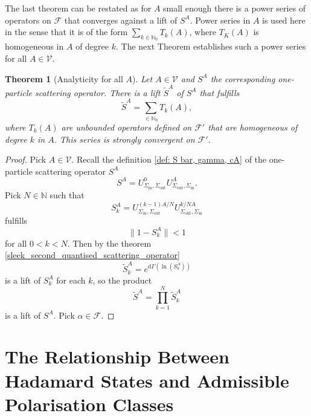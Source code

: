 \documentclass[b5paper,draft,openbib,12pt]{memoir}
\newtheorem{Thm}[Def]{Theorem}
\begin{document}
The last theorem can be restated as for \(A\) small enough 
there is a power series of operators on \(\mathcal{F}\)
that converges against a lift of \(S^A\). Power series in \(A\) 
is used here in the sense that it is of the form 
\(\sum_{k\in\mathbb{N}_0} T_k(A)\), where \(T_K(A)\) is 
homogeneous in \(A\) of degree \(k\). The next Theorem 
establishes such a power series for all \(A\in\mathcal{V}\).

\begin{Thm}[Analyticity for all \(A\)]
  Let \(A\in\mathcal{V}\) and \(S^A\) the corresponding one-particle 
  scattering operator. There is a lift \(\tilde{S}^A\) of \(S^A\)
  that fulfills 
\begin{equation}
  \tilde{S}^A=\sum_{\in\mathbb{N}_0} T_k(A),
\end{equation}
  where \(T_k(A)\) are unbounded operators defined on 
  \(\mathcal{F}'\) that are homogeneous of degree \(k\) in \(A\).
  This series is strongly convergent on \(\mathcal{F}'\).
\end{Thm}

\begin{proof}
Pick \(A\in\mathcal{V}\). Recall the definition 
\ref{def: S bar, gamma, cA} of 
the one-particle scattering operator 
\(S^A\) 
\begin{equation}
  S^A= U^0_{\Sigma_{\text{in}},\Sigma_{\text{out}}}U^A_{\Sigma_{\text{out}},\Sigma_{\text{in}}}.
\end{equation}
Pick \(N\in\mathbb{N}\) such that 
\begin{equation}
  S^A_k=U^{(k-1)A/N}_{\Sigma_{\text{in}},\Sigma_{\text{out}}}U^{k/N A}_{\Sigma_{\text{out}},\Sigma_{\text{in}}}
\end{equation}
fulfills 
\begin{equation}
\|1-S^A_k\|<1
\end{equation}
for all \(0<k<N\). Then by the theorem \ref{sleek_second_quantised_scattering_operator}
\begin{equation}
  \tilde{S}^A_k=e^{\mathrm{d}\Gamma(\ln(S^A_k))}
\end{equation}
is a lift of \(S^A_k\) for each \(k\), so the product
\begin{equation}
  \tilde{S}^A = \prod_{k=1}^N \tilde{S}^A_k
\end{equation}
is a lift of \(S^A\). Pick \(\alpha \in \mathcal{F}\). 
\end{proof}


\section{The Relationship Between Hadamard States and Admissible Polarisation Classes}\label{sec: hadamard}
\end{document}
